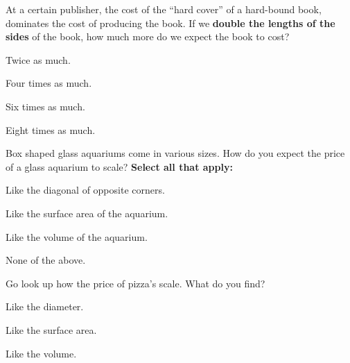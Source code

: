 \documentclass[noauthor,nooutcomes]{ximera}
\author{Bart Snapp}
\begin{document}
\maketitle







\begin{exercise}
 At a certain publisher, the cost of the ``hard cover'' of a
 hard-bound book, dominates the cost of producing the book. If we
 \textbf{double the lengths of the sides} of the book, how much more do we expect the
 book to cost?
 \begin{enumerate}
   \begin{multicols}{2}
   \item Twice as much.
   \item Four times as much.
   \item Six times as much.
   \item Eight times as much.
   \end{multicols}
 \end{enumerate}
\end{exercise}


\begin{exercise}
  Box shaped glass aquariums come in various sizes. How do you expect
  the price of a glass aquarium to scale?  \textbf{Select all that
    apply:}
 \begin{enumerate}
   \begin{multicols}{2}
   \item Like the diagonal of opposite corners.
   \item Like the surface area of the aquarium.
   \item Like the volume of the aquarium.
   \item None of the above.
   \end{multicols}
 \end{enumerate}
\end{exercise}



\begin{exercise}
  Go look up how the price of pizza's scale. What do you find?
 \begin{enumerate}
   \begin{multicols}{2}
   \item Like the diameter.
   \item Like the surface area.
   \item Like the volume.
   \end{multicols}
 \end{enumerate}
\end{exercise}
\end{document}
